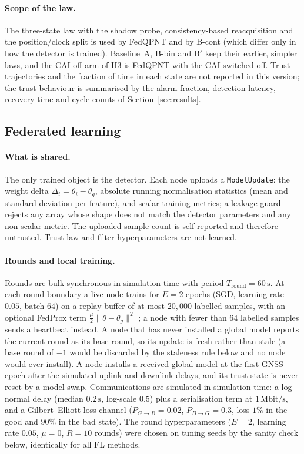 \documentclass[journal]{IEEEtran}
\begin{document}
\paragraph{Scope of the law.}
The three-state law with the shadow probe, consistency-based reacquisition and the position/clock split is
used by FedQPNT and by B-cont (which differ only in how the detector is trained). Baseline~A, B-bin and B$'$
keep their earlier, simpler laws, and the CAI-off arm of H3 is FedQPNT with the CAI switched off.
Trust trajectories and the fraction of time in each state are not reported in this version; the trust behaviour is summarised by the alarm fraction, detection latency, recovery time and cycle counts of Section~\ref{sec:results}.

\subsection{Federated learning}
\label{sec:fl}
\paragraph{What is shared.}
The only trained object is the detector. Each node uploads a \texttt{ModelUpdate}: the weight delta
$\Delta_i = \theta_i - \theta_g$, absolute running normalisation statistics (mean and standard deviation per
feature), and scalar training metrics; a leakage guard rejects any array whose shape does not match the
detector parameters and any non-scalar metric. The uploaded sample count is self-reported and therefore
untrusted. Trust-law and filter hyperparameters are not learned.

\paragraph{Rounds and local training.}
Rounds are bulk-synchronous in simulation time with period $T_{\mathrm{round}} = 60\,\mathrm{s}$. At each
round boundary a live node trains for $E = 2$ epochs (SGD, learning rate $0.05$, batch $64$) on a replay
buffer of at most $20{,}000$ labelled samples, with an optional FedProx term
$\tfrac{\mu}{2}\lVert\theta-\theta_g\rVert^2$ \cite{li2020fedprox}; a node with fewer than $64$ labelled
samples sends a heartbeat instead. A node that has never installed a global model reports the current round as its base round, so its update is fresh
rather than stale (a base round of $-1$ would be discarded by the staleness rule below and no node would ever install). A node installs a received global model at the first GNSS epoch after
the simulated uplink and downlink delays, and its trust state is never reset by a model swap.
Communications are simulated in simulation time: a log-normal delay (median $0.2\,\mathrm{s}$, log-scale
$0.5$) plus a serialisation term at $1\,\mathrm{Mbit/s}$, and a Gilbert--Elliott loss channel
($P_{G\rightarrow B} = 0.02$, $P_{B\rightarrow G} = 0.3$, loss $1\%$ in the good and $90\%$ in the bad
state). The round hyperparameters ($E=2$, learning rate $0.05$, $\mu=0$, $R=10$ rounds) were chosen on
tuning seeds by the sanity check below, identically for all FL methods.
\end{document}
